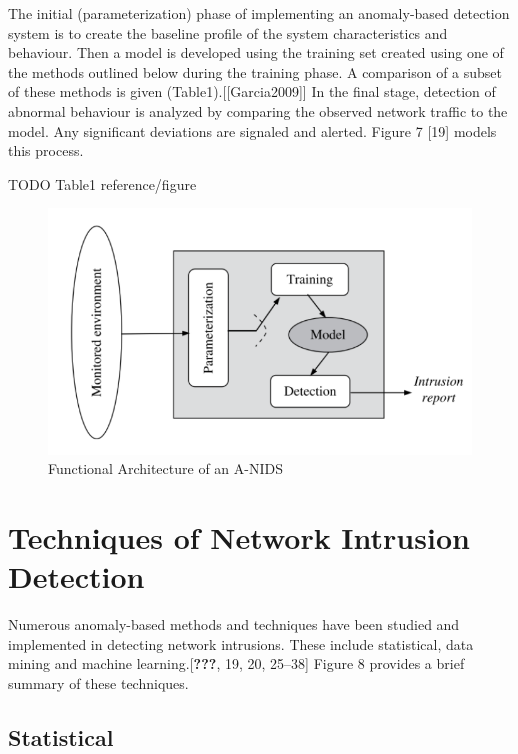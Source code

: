 \documentclass[12pt,]{article}
\begin{document}
The initial (parameterization) phase of implementing an anomaly-based
detection system is to create the baseline profile of the system
characteristics and behaviour. Then a model is developed using the
training set created using one of the methods outlined below during the
training phase. A comparison of a subset of these methods is given
(Table1).{[}{[}Garcia2009{]}{]} In the final stage, detection of
abnormal behaviour is analyzed by comparing the observed network traffic
to the model. Any significant deviations are signaled and alerted.
Figure 7 {[}19{]} models this process.

TODO Table1 reference/figure

\begin{figure}

{\centering \includegraphics{thesis_files/figure-latex/unnamed-chunk-10-1} 

}

\caption{Functional Architecture of an A-NIDS}\label{fig:unnamed-chunk-10}
\end{figure}

\pagebreak

\section{Techniques of Network Intrusion
Detection}\label{techniques-of-network-intrusion-detection}

Numerous anomaly-based methods and techniques have been studied and
implemented in detecting network intrusions. These include statistical,
data mining and machine learning.{[}\textbf{???}, 19, 20, 25--38{]}
Figure 8 provides a brief summary of these techniques.

\subsection{Statistical}\label{statistical}
\end{document}
